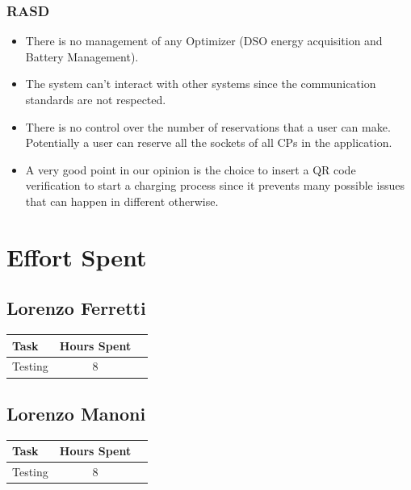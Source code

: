 \documentclass{Configuration_Files/PoliMi3i_thesis}
\begin{document}
\subsection {RASD}
\begin{itemize}
       \item There is no management of any Optimizer (DSO energy acquisition and Battery Management). 
       \item The system can't interact with other systems since the communication standards are not respected. 
        \item  There is no control over the number of reservations that a user can make. Potentially a user can reserve all the sockets of all CPs in the application.
        \item A very good point in our opinion is the choice to insert a QR code verification to start a charging process since it prevents many possible issues that can happen in different otherwise.
\end{itemize}

\chapter{Effort Spent}

\section{Lorenzo Ferretti}

\begin{table}[H]
    \centering 
    \begin{tabular}{|l|c|c|}
    \hline
    \rowcolor{bluepoli!40}
    \textbf{Task} & \textbf{Hours Spent}\T\B \\
    \hline
    Testing & 8\T\B \\
    \hline
    \end{tabular}
\end{table}

\section{Lorenzo Manoni}

\begin{table}[H]
    \centering 
    \begin{tabular}{|l|c|c|}
    \hline
    \rowcolor{bluepoli!40}
    \textbf{Task} & \textbf{Hours Spent}\T\B \\
    \hline
    Testing & 8\T\B \\
    \hline
    \end{tabular}
\end{table}
\end{document}
